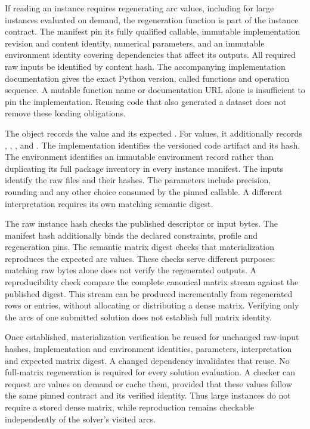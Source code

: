 If reading an instance requires regenerating arc values, including for large instances evaluated on demand, the regeneration function is part of the instance contract. The manifest \must{} pin its fully qualified callable, immutable implementation revision and content identity, numerical parameters, and an immutable environment identity covering dependencies that affect its outputs. All required raw inputs \must{} be identified by content hash. The accompanying implementation documentation gives the exact Python version, called functions and operation sequence. A mutable function name or documentation URL alone is insufficient to pin the implementation. Reusing code that also generated a dataset does not remove these loading obligations.

The  object records the value  and its expected . For  values, it additionally records , , ,  and . The implementation identifies the versioned code artifact and its hash. The environment identifies an immutable environment record rather than duplicating its full package inventory in every instance manifest. The inputs identify the raw files and their hashes. The parameters include precision, rounding and any other choice consumed by the pinned callable. A different interpretation requires its own matching semantic digest.

The raw instance hash checks the published descriptor or input bytes. The manifest hash additionally binds the declared constraints, profile and regeneration pins. The semantic matrix digest checks that materialization reproduces the expected arc values. These checks serve different purposes: matching raw bytes alone does not verify the regenerated outputs. A reproducibility check \must{} compare the complete canonical matrix stream against the published digest. This stream can be produced incrementally from regenerated rows or entries, without allocating or distributing a dense matrix. Verifying only the arcs of one submitted solution does not establish full matrix identity.

Once established, materialization verification \may{} be reused for unchanged raw-input hashes, implementation and environment identities, parameters, interpretation and expected matrix digest. A changed dependency invalidates that reuse. No full-matrix regeneration is required for every solution evaluation. A checker can request arc values on demand or cache them, provided that these values follow the same pinned contract and its verified identity. Thus large instances do not require a stored dense matrix, while reproduction remains checkable independently of the solver's visited arcs.

